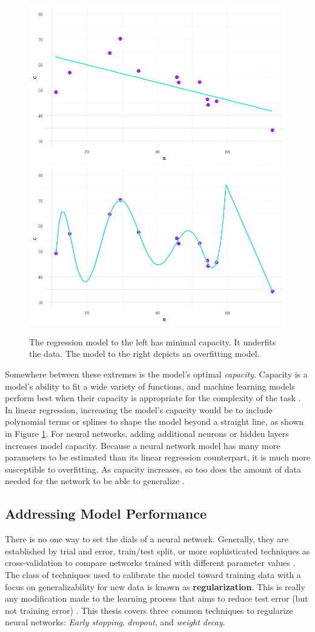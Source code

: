  \begin{figure}[H]
    \includegraphics[width=0.5\linewidth]{Figures/underfit.png}
    \includegraphics[width=0.5\linewidth]{Figures/overfit.png}
    \vspace{-20pt}
    \caption{\footnotesize{The regression model to the left has minimal capacity.  It underfits the data. The model to the right depicts an overfitting model.}}
    \label{capacityviz}
\end{figure}
 
 Somewhere between these extremes is the model's optimal \textit{capacity}.  Capacity is a model's ability to fit a wide variety of functions, and machine learning models perform best when their capacity is appropriate for the complexity of the task \cite{Goodfellow-et-al-2016}.  In linear regression, increasing the model's capacity would be to include polynomial terms or splines to shape the model beyond a straight line, as shown in Figure \ref{capacityviz}.  For neural networks, adding additional neurons or hidden layers increases model capacity.
 Because a neural network model has many more parameters to be estimated than its linear regression counterpart, it is much more susceptible to overfitting.  As capacity increases, so too does the amount of data needed for the network to be able to generalize \cite{baum1988size}.


\subsection{Addressing Model Performance}

There is no one way to set the dials of a neural network.  Generally, they are established by trial and error, train/test split, or more sophisticated techniques as cross-validation to compare networks trained with different parameter values \cite{mackay1992practical}.  The class of techniques used to calibrate the model toward training data with a focus on generalizability for new data is known as \textbf{regularization}.  This is really any modification made to the learning process that aims to reduce test error (but not training error) \cite{Goodfellow-et-al-2016}.  This thesis covers three common techniques to regularize neural networks: \textit{Early stopping}, \textit{dropout}, and \textit{weight decay}.

